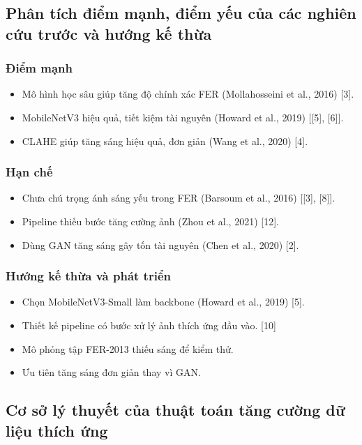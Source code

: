 \subsection{Phân tích điểm mạnh, điểm yếu của các nghiên cứu trước và hướng kế thừa}

\subsubsection{Điểm mạnh}
\begin{itemize}
    \item Mô hình học sâu giúp tăng độ chính xác FER (Mollahosseini et al., 2016) [3].
    \item MobileNetV3 hiệu quả, tiết kiệm tài nguyên (Howard et al., 2019) [[5], [6]].
    \item CLAHE giúp tăng sáng hiệu quả, đơn giản (Wang et al., 2020) [4].
\end{itemize}

\subsubsection{Hạn chế}
\begin{itemize}
    \item Chưa chú trọng ánh sáng yếu trong FER (Barsoum et al., 2016) [[3], [8]].
    \item Pipeline thiếu bước tăng cường ảnh (Zhou et al., 2021) [12].
    \item Dùng GAN tăng sáng gây tốn tài nguyên (Chen et al., 2020) [2].
\end{itemize}

\subsubsection{Hướng kế thừa và phát triển}
\begin{itemize}
    \item Chọn MobileNetV3-Small làm backbone (Howard et al., 2019) [5].
    \item Thiết kế pipeline có bước xử lý ảnh thích ứng đầu vào. [10]
    \item Mô phỏng tập FER-2013 thiếu sáng để kiểm thử.
    \item Ưu tiên tăng sáng đơn giản thay vì GAN.
\end{itemize}

\subsection{Cơ sở lý thuyết của thuật toán tăng cường dữ liệu thích ứng} %

